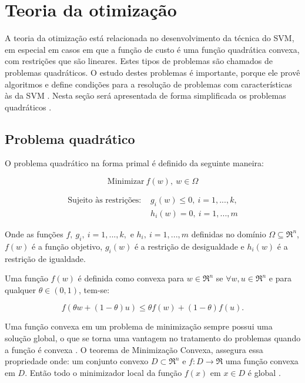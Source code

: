 \section{Teoria da otimização} \label{Teot}

A teoria da otimização está relacionada no desenvolvimento da técnica do SVM, em especial em casos em que a função de custo é uma função quadrática convexa, com restrições que são lineares. Estes tipos de problemas são chamados de problemas quadráticos. O estudo destes problemas é importante, porque ele provê algoritmos e define condições para a resolução de problemas com características às da SVM \cite{Cristianini2000}. Nesta seção será apresentada de forma simplificada os problemas quadráticos \label{Teot:S1}. %

\subsection{Problema quadrático} \label{Teot:S1}

O problema quadrático na forma primal é definido da seguinte maneira:

\begin{equation} \label{Teot:E1}
\text{Minimizar}\  f(w),\ w \in \Omega
\end{equation}

\begin{equation} \label{Teot:E2}
\begin{matrix}
\text{Sujeito às restrições: } & g_{i}(w) \leq 0,\ i=1,...,k, \\ 
&    h_{i}(w) = 0,\ i=1,...,m  
\end{matrix}
\end{equation}

Onde as funções $f,\ g_{i},\ i=1,...,k, $ e $h_{i},\ i=1,...,m$ definidas no domínio $\Omega \subseteq \Re^n$, $f(w)$ é a função objetivo, $g_{i}(w)$ é a restrição de desigualdade  e $h_{i}(w)$ é a restrição de igualdade.

Uma função $f(w)$ é definida como convexa para $w \in \Re^n$ se $\forall w, u \in \Re^n$ e para qualquer $\theta \in (0,1)$, tem-se:

\begin{equation} \label{Teot:E3}
f(\theta w + (1 - \theta)u) \leq \theta f(w) + (1 - \theta)f(u).
\end{equation} 

Uma função convexa em um problema de minimização sempre possui uma solução global, o que se torna uma vantagem no tratamento do problemas quando a função é convexa \cite{Cristianini2000}. O teorema de Minimização Convexa, assegura essa propriedade onde: um conjunto convexo $D \subset \Re^n$ e $f:D \rightarrow \Re$ uma função convexa em $D$. Então todo o minimizador local da função $f(x)$ em $x \in D$ é global \cite{Ales2008}.

